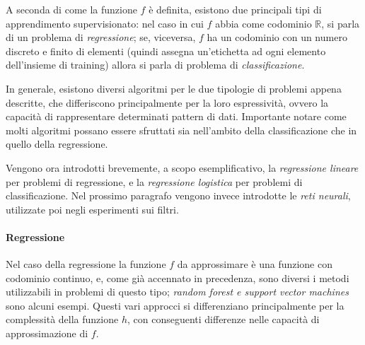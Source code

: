 \documentclass[../../main.tex]{subfiles}
\begin{document}
    A seconda di come la funzione $f$ è definita, esistono due principali tipi di apprendimento supervisionato: nel caso in cui $f$ abbia come codominio $\mathbb{R}$, si parla di un problema di \textit{regressione}; se, viceversa, $f$ ha un codominio con un numero discreto e finito di elementi (quindi assegna un'etichetta ad ogni elemento dell'insieme di training) allora si parla di problema di \textit{classificazione}.

    In generale, esistono diversi algoritmi per le due tipologie di problemi appena descritte, che differiscono principalmente per la loro espressività, ovvero la capacità di rappresentare determinati pattern di dati. Importante notare come molti algoritmi possano essere sfruttati sia nell'ambito della classificazione che in quello della regressione.

    Vengono ora introdotti brevemente, a scopo esemplificativo, la \textit{regressione lineare} per problemi di regressione, e la \textit{regressione logistica} per problemi di classificazione. Nel prossimo paragrafo vengono invece introdotte le \textit{reti neurali}, utilizzate poi negli esperimenti sui filtri.

    \paragraph{Regressione} Nel caso della regressione la funzione $f$ da approssimare è una funzione con codominio continuo, e, come già accennato in precedenza, sono diversi i metodi utilizzabili in problemi di questo tipo; \textit{random forest e support vector machines} sono alcuni esempi. Questi vari approcci si differenziano principalmente per la complessità della funzione $h$, con conseguenti differenze nelle capacità di approssimazione di $f$.
\end{document}
